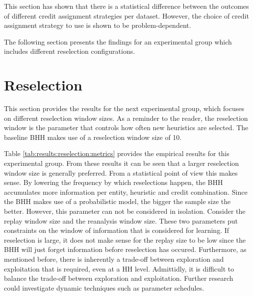 This section has shown that there is a statistical difference between the outcomes of different credit assignment strategies per dataset. However, the choice of credit assignment strategy to use is shown to be problem-dependent.

The following section presents the findings for an experimental group which includes different reselection configurations.





\section{Reselection}
\label{sec:results:reselection}

This section provides the results for the next experimental group, which focuses on different reselection window sizes. As a reminder to the reader, the reselection window is the parameter that controls how often new heuristics are selected. The baseline \Ac{BHH} makes use of a reselection window size of 10.

Table \ref{tab:results:reselection:metrics} provides the empirical results for this experimental group. From these results it can be seen that a larger reselection window size is generally preferred. From a statistical point of view this makes sense. By lowering the frequency by which reselections happen, the \Ac{BHH} accumulates more information per entity, heuristic and credit combination. Since the \Ac{BHH} makes use of a probabilistic model, the bigger the sample size the better. However, this parameter can not be considered in isolation. Consider the replay window size and the reanalysis window size. These two parameters put constraints on the window of information that is considered for learning. If reselection is large, it does not make sense for the replay size to be low since the \Ac{BHH} will just forget information before reselection has occured. Furthermore, as mentioned before, there is inherently a trade-off between exploration and exploitation that is required, even at a \ac{HH} level. Admittidly, it is difficult to balance the trade-off between exploration and exploitation. Further research could investigate dynamic techniques such as parameter schedules.

